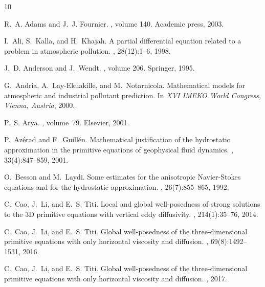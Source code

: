 \documentclass[11pt]{article}
\begin{document}
\nocite{*}


\begin{thebibliography}{10}

R.~A. Adams and J.~J. Fournier.
, volume 140.
\newblock Academic press, 2003.

I.~Ali, S.~Kalla, and H.~Khajah.
\newblock A partial differential equation related to a problem in atmospheric pollution.
, 28(12):1--6, 1998.

J.~D. Anderson and J.~Wendt.
, volume 206.
\newblock Springer, 1995.

G.~Andria, A.~Lay-Ekuakille, and M.~Notarnicola.
\newblock Mathematical models for atmospheric and industrial pollutant prediction.
\newblock In {\em XVI IMEKO World Congress, Vienna, Austria}, 2000.

P.~S. Arya.
, volume~79.
\newblock Elsevier, 2001.

P.~Az{\'e}rad and F.~Guill{\'e}n.
\newblock Mathematical justification of the hydrostatic approximation in the primitive equations of geophysical fluid dynamics.
, 33(4):847--859, 2001.

O.~Besson and M.~Laydi.
\newblock Some estimates for the anisotropic Navier-Stokes equations and for the hydrostatic approximation.
, 26(7):855--865, 1992.

C.~Cao, J.~Li, and E.~S. Titi.
\newblock Local and global well-posedness of strong solutions to the 3D primitive equations with vertical eddy diffusivity.
, 214(1):35--76, 2014.

C.~Cao, J.~Li, and E.~S. Titi.
\newblock Global well-posedness of the three-dimensional primitive equations with only horizontal viscosity and diffusion.
, 69(8):1492--1531, 2016.

C.~Cao, J.~Li, and E.~S. Titi.
\newblock Global well-posedness of the three-dimensional primitive equations with only horizontal viscosity and diffusion.
, 2017.


\end{thebibliography}
\end{document}
